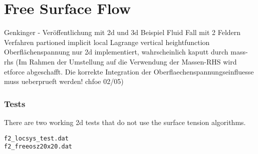 \chapter{Free Surface Flow}


Genkinger - Ver\"offentlichung mit 2d und 3d Beispiel
Fluid Fall mit 2 Feldern
Verfahren
partioned implicit local Lagrange
vertical heightfunction
Oberfl\"achenspannung nur 2d implementiert, wahrscheinlich kaputt durch mass-rhs
(Im Rahmen der Umstellung auf die Verwendung der Massen-RHS wird etforce abgeschafft. Die korrekte Integration der
            Oberflaechenspannungseinfluesse muss ueberprueft werden!   chfoe 02/05)


\subsection{Tests}

There are two working 2d tests that do not use the surface tension algorithms.

\begin{verbatim}
f2_locsys_test.dat 
f2_freeosz20x20.dat
\end{verbatim}
